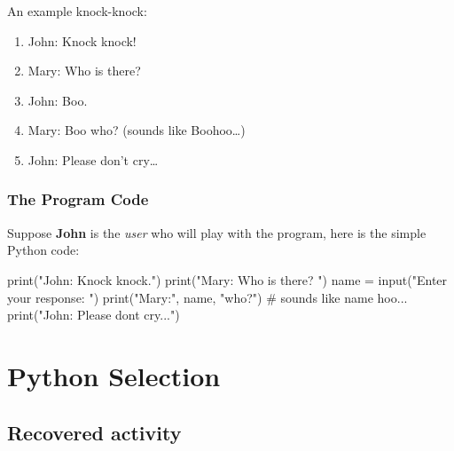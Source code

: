 \documentclass[
  letterpaper,
]{scrbook}
\newenvironment{Shaded}{\begin{snugshade}}{\end{snugshade}}
\newcommand{\BuiltInTok}[1]{\textcolor[rgb]{0.00,0.23,0.31}{#1}}
\newcommand{\CommentTok}[1]{\textcolor[rgb]{0.37,0.37,0.37}{#1}}
\newcommand{\NormalTok}[1]{\textcolor[rgb]{0.00,0.23,0.31}{#1}}
\newcommand{\OperatorTok}[1]{\textcolor[rgb]{0.37,0.37,0.37}{#1}}
\newcommand{\StringTok}[1]{\textcolor[rgb]{0.13,0.47,0.30}{#1}}
\providecommand{\tightlist}{%
  \setlength{\itemsep}{0pt}\setlength{\parskip}{0pt}}
\begin{document}
An example knock-knock:

\begin{enumerate}
\def\labelenumi{\arabic{enumi}.}
\tightlist
\item
  John: Knock knock!
\item
  Mary: Who is there?
\item
  John: Boo.
\item
  Mary: Boo who? (sounds like Boohoo\ldots)
\item
  John: Please don't cry\ldots{}
\end{enumerate}

\subsection*{The Program Code}\label{the-program-code}

Suppose \textbf{John} is the \emph{user} who will play with the program,
here is the simple Python code:

\begin{Shaded}
\begin{Highlighting}[]
\BuiltInTok{print}\NormalTok{(}\StringTok{"John: Knock knock."}\NormalTok{)}
\BuiltInTok{print}\NormalTok{(}\StringTok{"Mary: Who is there? "}\NormalTok{)}
\NormalTok{name }\OperatorTok{=} \BuiltInTok{input}\NormalTok{(}\StringTok{"Enter your response: "}\NormalTok{)}
\BuiltInTok{print}\NormalTok{(}\StringTok{"Mary:"}\NormalTok{, name, }\StringTok{"who?"}\NormalTok{) }\CommentTok{\# sounds like name hoo...}
\BuiltInTok{print}\NormalTok{(}\StringTok{"John: Please don\textquotesingle{}t cry..."}\NormalTok{)}
\end{Highlighting}
\end{Shaded}

\chapter*{Python Selection}\label{ch-lab-python-selection}


\section*{Recovered activity}\label{sec-lab-python-selection}

\end{document}
